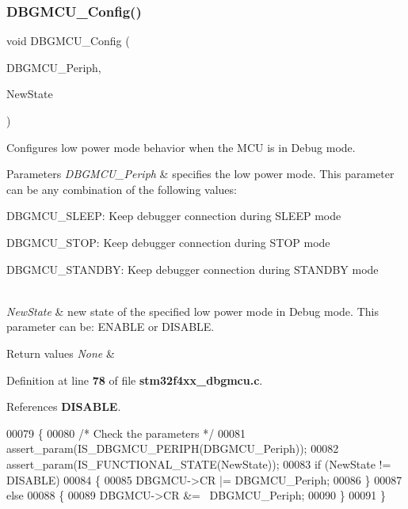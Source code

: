 \subsubsection{D\+B\+G\+M\+C\+U\+\_\+\+Config()}
{\footnotesize\ttfamily void D\+B\+G\+M\+C\+U\+\_\+\+Config (\begin{DoxyParamCaption}\item[{uint32\+\_\+t}]{D\+B\+G\+M\+C\+U\+\_\+\+Periph,  }\item[{\textbf{ Functional\+State}}]{New\+State }\end{DoxyParamCaption})}



Configures low power mode behavior when the M\+CU is in Debug mode. 


\begin{DoxyParams}{Parameters}
{\em D\+B\+G\+M\+C\+U\+\_\+\+Periph} & specifies the low power mode. This parameter can be any combination of the following values\+: \begin{DoxyItemize}
\item D\+B\+G\+M\+C\+U\+\_\+\+S\+L\+E\+EP\+: Keep debugger connection during S\+L\+E\+EP mode \item D\+B\+G\+M\+C\+U\+\_\+\+S\+T\+OP\+: Keep debugger connection during S\+T\+OP mode \item D\+B\+G\+M\+C\+U\+\_\+\+S\+T\+A\+N\+D\+BY\+: Keep debugger connection during S\+T\+A\+N\+D\+BY mode \end{DoxyItemize}
\\
\hline
{\em New\+State} & new state of the specified low power mode in Debug mode. This parameter can be\+: E\+N\+A\+B\+LE or D\+I\+S\+A\+B\+LE. \\
\hline
\end{DoxyParams}

\begin{DoxyRetVals}{Return values}
{\em None} & \\
\hline
\end{DoxyRetVals}


Definition at line \textbf{ 78} of file \textbf{ stm32f4xx\+\_\+dbgmcu.\+c}.



References \textbf{ D\+I\+S\+A\+B\+LE}.


\begin{DoxyCode}
00079 \{
00080   \textcolor{comment}{/* Check the parameters */}
00081   assert_param(IS_DBGMCU_PERIPH(DBGMCU\_Periph));
00082   assert_param(IS_FUNCTIONAL_STATE(NewState));
00083   \textcolor{keywordflow}{if} (NewState != DISABLE)
00084   \{
00085     DBGMCU->CR |= DBGMCU\_Periph;
00086   \}
00087   \textcolor{keywordflow}{else}
00088   \{
00089     DBGMCU->CR &= ~DBGMCU\_Periph;
00090   \}
00091 \}
\end{DoxyCode}
\mbox{\label{group__DBGMCU__Private__Functions_gac34193c34dbce759bf424957a31b3266}} 
